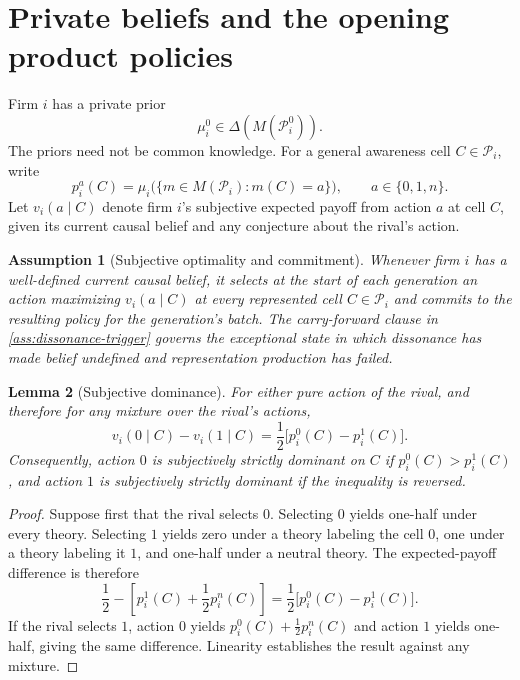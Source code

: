 \documentclass[11pt]{article}
\newtheorem{assumption}{Assumption}[section]
\newtheorem{lemma}[assumption]{Lemma}
\begin{document}
\section{Private beliefs and the opening product policies}

Firm $i$ has a private prior
\[
\mu_i^0\in\Delta(M(\mathcal P_i^0)).
\]
The priors need not be common knowledge.  For a general awareness cell
$C\in\mathcal P_i$, write
\[
p_i^a(C)
=
\mu_i\big(\{m\in M(\mathcal P_i):m(C)=a\}\big),
\qquad a\in\{0,1,n\}.
\]
Let $v_i(a\mid C)$ denote firm $i$'s subjective expected payoff from action
$a$ at cell $C$, given its current causal belief and any conjecture about the
rival's action.

\begin{assumption}[Subjective optimality and commitment]
\label{ass:subjective-optimality}
Whenever firm $i$ has a well-defined current causal belief, it selects at the
start of each generation an action maximizing $v_i(a\mid C)$ at every
represented cell $C\in\mathcal P_i$ and commits to the resulting policy for the
generation's batch.  The carry-forward clause in
\cref{ass:dissonance-trigger} governs the exceptional state in which
dissonance has made belief undefined and representation production has failed.
\end{assumption}

\begin{lemma}[Subjective dominance]
\label{lem:dominance}
For either pure action of the rival, and therefore for any mixture over the
rival's actions,
\begin{equation}
v_i(0\mid C)-v_i(1\mid C)
=
\frac12\big[p_i^0(C)-p_i^1(C)\big].
\label{eq:dominance-difference}
\end{equation}
Consequently, action $0$ is subjectively strictly dominant on $C$ if
$p_i^0(C)>p_i^1(C)$, and action $1$ is subjectively strictly dominant if the
inequality is reversed.
\end{lemma}

\begin{proof}
Suppose first that the rival selects $0$.  Selecting $0$ yields one-half under
every theory.  Selecting $1$ yields zero under a theory labeling the cell $0$,
one under a theory labeling it $1$, and one-half under a neutral theory.  The
expected-payoff difference is therefore
\[
\frac12-\left[p_i^1(C)+\frac12p_i^n(C)\right]
=
\frac12\big[p_i^0(C)-p_i^1(C)\big].
\]
If the rival selects $1$, action $0$ yields
$p_i^0(C)+\frac12p_i^n(C)$ and action $1$ yields one-half, giving the same
difference.  Linearity establishes the result against any mixture.
\end{proof}
\end{document}
